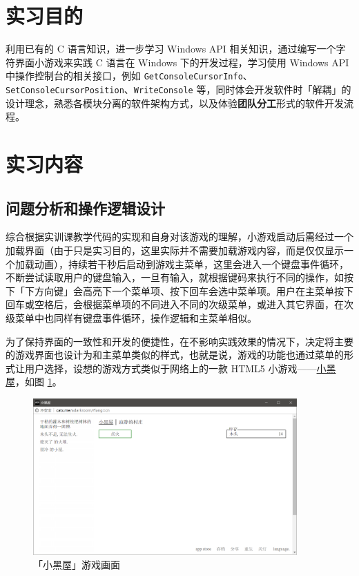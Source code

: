 \documentclass[a4paper, 11pt]{article}
\newcommand{\codeinline}{\texttt}
\begin{document}
\tableofcontents
\clearpage

\section{实习目的}

利用已有的 C 语言知识，进一步学习 Windows API 相关知识，通过编写一个字符界面小游戏来实践 C 语言在 Windows 下的开发过程，学习使用 Windows API 中操作控制台的相关接口，例如 \codeinline{GetConsoleCursorInfo}、\codeinline{SetConsoleCursorPosition}、\codeinline{WriteConsole} 等，同时体会开发软件时「解耦」的设计理念，熟悉各模块分离的软件架构方式，以及体验\textbf{团队分工}形式的软件开发流程。

\section{实习内容}

\subsection{问题分析和操作逻辑设计}

综合根据实训课教学代码的实现和自身对该游戏的理解，小游戏启动后需经过一个加载界面（由于只是实习目的，这里实际并不需要加载游戏内容，而是仅仅显示一个加载动画），持续若干秒后启动到游戏主菜单，这里会进入一个键盘事件循环，不断尝试读取用户的键盘输入，一旦有输入，就根据键码来执行不同的操作，如按下「下方向键」会高亮下一个菜单项、按下回车会选中菜单项。用户在主菜单按下回车或空格后，会根据菜单项的不同进入不同的次级菜单，或进入其它界面，在次级菜单中也同样有键盘事件循环，操作逻辑和主菜单相似。

为了保持界面的一致性和开发的便捷性，在不影响实践效果的情况下，决定将主要的游戏界面也设计为和主菜单类似的样式，也就是说，游戏的功能也通过菜单的形式让用户选择，设想的游戏方式类似于网络上的一款 HTML5 小游戏——\href{http://catx.me/adarkroom/?lang=cn}{小黑屋}，如图 \ref{fig:adarkroom}。

\begin{figure}[htp]
	\centering\includegraphics[width=0.9\textwidth]{adarkroom}
	\caption{「小黑屋」游戏画面}
	\label{fig:adarkroom}
\end{figure}
\end{document}
